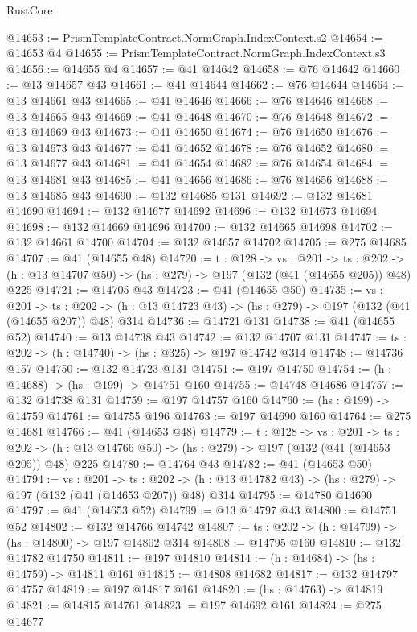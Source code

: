 \begin{lexlean}{RustCore}
\begin{coremodule}
@14653 := PrismTemplateContract.NormGraph.IndexContext.s2
@14654 := @14653 @4
@14655 := PrismTemplateContract.NormGraph.IndexContext.s3
@14656 := @14655 @4
@14657 := @41 @14642
@14658 := @76 @14642
@14660 := @13 @14657 @43
@14661 := @41 @14644
@14662 := @76 @14644
@14664 := @13 @14661 @43
@14665 := @41 @14646
@14666 := @76 @14646
@14668 := @13 @14665 @43
@14669 := @41 @14648
@14670 := @76 @14648
@14672 := @13 @14669 @43
@14673 := @41 @14650
@14674 := @76 @14650
@14676 := @13 @14673 @43
@14677 := @41 @14652
@14678 := @76 @14652
@14680 := @13 @14677 @43
@14681 := @41 @14654
@14682 := @76 @14654
@14684 := @13 @14681 @43
@14685 := @41 @14656
@14686 := @76 @14656
@14688 := @13 @14685 @43
@14690 := @132 @14685 @131
@14692 := @132 @14681 @14690
@14694 := @132 @14677 @14692
@14696 := @132 @14673 @14694
@14698 := @132 @14669 @14696
@14700 := @132 @14665 @14698
@14702 := @132 @14661 @14700
@14704 := @132 @14657 @14702
@14705 := @275 @14685
@14707 := @41 (@14655 @48)
@14720 := {t : @128} ->
  {vs : @201} ->
  {ts : @202} -> (h : @13 @14707 @50) -> (hs : @279) -> @197 (@132 (@41 (@14655 @205)) @48) @225
@14721 := @14705 @43
@14723 := @41 (@14655 @50)
@14735 := {vs : @201} ->
  {ts : @202} -> (h : @13 @14723 @43) -> (hs : @279) -> @197 (@132 (@41 (@14655 @207)) @48) @314
@14736 := @14721 @131
@14738 := @41 (@14655 @52)
@14740 := @13 @14738 @43
@14742 := @132 @14707 @131
@14747 := {ts : @202} -> (h : @14740) -> (hs : @325) -> @197 @14742 @314
@14748 := @14736 @157
@14750 := @132 @14723 @131
@14751 := @197 @14750
@14754 := (h : @14688) -> (hs : @199) -> @14751 @160
@14755 := @14748 @14686
@14757 := @132 @14738 @131
@14759 := @197 @14757 @160
@14760 := (hs : @199) -> @14759
@14761 := @14755 @196
@14763 := @197 @14690 @160
@14764 := @275 @14681
@14766 := @41 (@14653 @48)
@14779 := {t : @128} ->
  {vs : @201} ->
  {ts : @202} -> (h : @13 @14766 @50) -> (hs : @279) -> @197 (@132 (@41 (@14653 @205)) @48) @225
@14780 := @14764 @43
@14782 := @41 (@14653 @50)
@14794 := {vs : @201} ->
  {ts : @202} -> (h : @13 @14782 @43) -> (hs : @279) -> @197 (@132 (@41 (@14653 @207)) @48) @314
@14795 := @14780 @14690
@14797 := @41 (@14653 @52)
@14799 := @13 @14797 @43
@14800 := @14751 @52
@14802 := @132 @14766 @14742
@14807 := {ts : @202} -> (h : @14799) -> (hs : @14800) -> @197 @14802 @314
@14808 := @14795 @160
@14810 := @132 @14782 @14750
@14811 := @197 @14810
@14814 := (h : @14684) -> (hs : @14759) -> @14811 @161
@14815 := @14808 @14682
@14817 := @132 @14797 @14757
@14819 := @197 @14817 @161
@14820 := (hs : @14763) -> @14819
@14821 := @14815 @14761
@14823 := @197 @14692 @161
@14824 := @275 @14677

\end{coremodule}
\end{lexlean}
